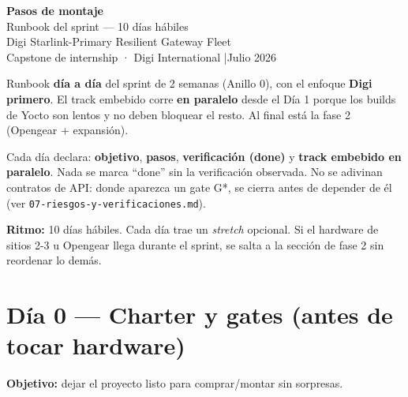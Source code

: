 \documentclass[11pt,a4paper]{article}
\newcommand{\file}[1]{\texttt{#1}}
\begin{document}
\begin{center}
  {\Huge\bfseries\color{accentdark} Pasos de montaje}\\[6pt]
  {\large Runbook del sprint — 10 días hábiles}\\[2pt]
  {\normalsize Digi Starlink-Primary Resilient Gateway Fleet}\\[10pt]
  {\small Capstone de internship · Digi International \quad|\quad Julio 2026}
\end{center}

\vspace{4pt}
\begin{nota}
\small
Runbook \textbf{día a día} del sprint de 2 semanas (Anillo 0), con el enfoque
\textbf{Digi primero}. El track embebido corre \textbf{en paralelo} desde el Día 1 porque
los builds de Yocto son lentos y no deben bloquear el resto. Al final está la fase 2
(Opengear + expansión).

\medskip
Cada día declara: \textbf{objetivo}, \textbf{pasos}, \textbf{verificación (done)} y
\textbf{track embebido en paralelo}. Nada se marca ``done'' sin la verificación observada.
No se adivinan contratos de API: donde aparezca un gate G*, se cierra antes de depender de él
(ver \file{07-riesgos-y-verificaciones.md}).

\medskip
\textbf{Ritmo:} 10 días hábiles. Cada día trae un \textit{stretch} opcional.
Si el hardware de sitios 2-3 u Opengear llega durante el sprint, se salta a la sección de
fase 2 sin reordenar lo demás.
\end{nota}

\vspace{2pt}
{\small\tableofcontents}
\vspace{6pt}

\section{Día 0 — Charter y gates (antes de tocar hardware)}

\textbf{Objetivo:} dejar el proyecto listo para comprar/montar sin sorpresas.
\end{document}
